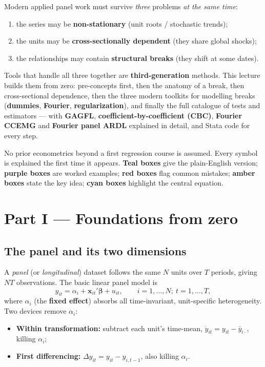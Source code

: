 \documentclass[11pt,a4paper]{article}
\newcommand{\hlt}[2]{\textcolor{#1}{\textbf{#2}}}
\newcommand{\bbeta}{\boldsymbol{\beta}}
\newcommand{\bx}{\mathbf{x}}
\theoremstyle{definition}
\begin{document}
Modern applied panel work must survive \emph{three} problems \emph{at the same time}:
\begin{enumerate}[leftmargin=1.5em,itemsep=1pt]
  \item the series may be \hlt{cblue}{non-stationary} (unit roots / stochastic trends);
  \item the units may be \hlt{ccyan}{cross-sectionally dependent} (they share global shocks);
  \item the relationships may contain \hlt{camber}{structural breaks} (they shift at some dates).
\end{enumerate}
Tools that handle all three together are \hlt{cgrape}{third-generation} methods. This lecture builds
them from zero: pre-concepts first, then the anatomy of a break, then cross-sectional dependence,
then the three modern toolkits for modelling breaks (\hlt{cblue}{dummies}, \hlt{cgrape}{Fourier},
\hlt{cteal}{regularization}), and finally the full catalogue of tests and estimators --- with
\textbf{GAGFL}, \textbf{coefficient-by-coefficient (CBC)}, \textbf{Fourier CCEMG} and
\textbf{Fourier panel ARDL} explained in detail, and Stata code for every step.

\begin{begbox}
No prior econometrics beyond a first regression course is assumed. Every symbol is explained the
first time it appears. \hlt{cteal}{Teal boxes} give the plain-English version; \hlt{cgrape}{purple
boxes} are worked examples; \hlt{cred}{red boxes} flag common mistakes; \hlt{camber}{amber boxes}
state the key idea; \hlt{ccyan}{cyan boxes} highlight the central equation.
\end{begbox}

\section{Part I --- Foundations from zero}

\subsection{The panel and its two dimensions}
A \emph{panel} (or \emph{longitudinal}) dataset follows the same $N$ units over $T$ periods, giving
$NT$ observations. The basic linear panel model is
\begin{equation}
y_{it}=\alpha_i+\bx_{it}'\bbeta+u_{it},\qquad i=1,\dots,N;\ t=1,\dots,T,
\end{equation}
where $\alpha_i$ (the \hlt{cblue}{fixed effect}) absorbs all time-invariant, unit-specific
heterogeneity. Two devices remove $\alpha_i$:
\begin{itemize}[leftmargin=1.4em,itemsep=1pt]
 \item \textbf{Within transformation:} subtract each unit's time-mean,
 $\ddot y_{it}=y_{it}-\bar y_{i\cdot}$, killing $\alpha_i$;
 \item \textbf{First differencing:} $\Delta y_{it}=y_{it}-y_{i,t-1}$, also killing $\alpha_i$.
\end{itemize}
\end{document}
